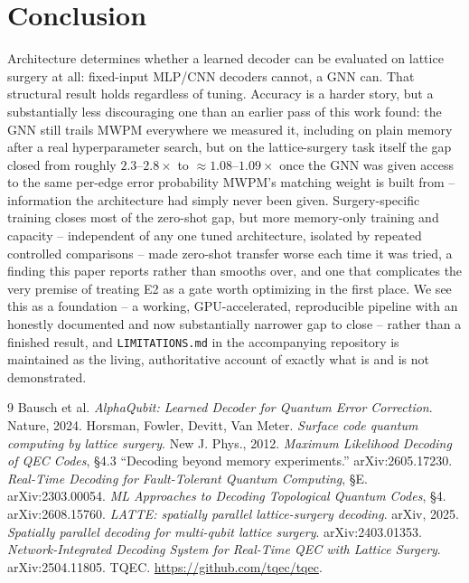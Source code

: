 \documentclass[11pt]{article}
\begin{document}
\section{Conclusion}

Architecture determines whether a learned decoder can be evaluated on
lattice surgery at all: fixed-input MLP/CNN decoders cannot, a GNN can. That
structural result holds regardless of tuning. Accuracy is a harder story,
but a substantially less discouraging one than an earlier pass of this work
found: the GNN still trails MWPM everywhere we measured it, including on
plain memory after a real hyperparameter search, but on the lattice-surgery
task itself the gap closed from roughly $2.3$--$2.8\times$ to
$\approx 1.08$--$1.09\times$ once the GNN was given access to the same
per-edge error probability MWPM's matching weight is built from --
information the architecture had simply never been given. Surgery-specific
training closes most of the zero-shot gap, but more memory-only training
and capacity -- independent of any one tuned architecture, isolated by
repeated controlled comparisons -- made zero-shot transfer worse each time
it was tried, a finding this paper reports rather than smooths over, and
one that complicates the very premise of treating E2 as a gate worth
optimizing in the first place. We see this as a foundation -- a working,
GPU-accelerated, reproducible pipeline with an honestly documented and
now substantially narrower gap to close -- rather than a finished result,
and \texttt{LIMITATIONS.md} in the accompanying repository is maintained as
the living, authoritative account of exactly what is and is not
demonstrated.

\begin{thebibliography}{9}
 Bausch et al. \emph{AlphaQubit: Learned Decoder for
  Quantum Error Correction}. Nature, 2024.
 Horsman, Fowler, Devitt, Van Meter. \emph{Surface code
  quantum computing by lattice surgery}. New J. Phys., 2012.
 \emph{Maximum Likelihood Decoding of QEC Codes}, \S4.3
  ``Decoding beyond memory experiments.'' arXiv:2605.17230.
 \emph{Real-Time Decoding for Fault-Tolerant Quantum
  Computing}, \S E. arXiv:2303.00054.
 \emph{ML Approaches to Decoding Topological Quantum
  Codes}, \S4. arXiv:2608.15760.
 \emph{LATTE: spatially parallel lattice-surgery
  decoding}. arXiv, 2025.
 \emph{Spatially parallel decoding for multi-qubit
  lattice surgery}. arXiv:2403.01353.
 \emph{Network-Integrated Decoding System for
  Real-Time QEC with Lattice Surgery}. arXiv:2504.11805.
 TQEC. \url{https://github.com/tqec/tqec}.
\end{thebibliography}
\end{document}
